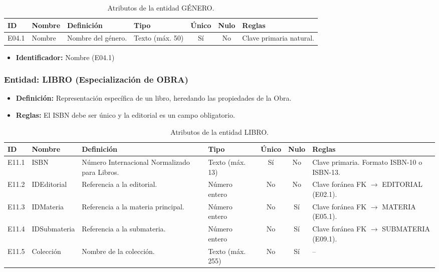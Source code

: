 	\begin{table}[H]
		\centering
		\caption{Atributos de la entidad GÉNERO.}
		\label{tab:dict_genero}
		\small
		\begin{tabularx}{\textwidth}{l l X l c c X}
			\toprule
			\textbf{ID} & \textbf{Nombre} & \textbf{Definición} & \textbf{Tipo} & \textbf{Único} & \textbf{Nulo} & \textbf{Reglas} \\
			\midrule
			E04.1 & Nombre & Nombre del género. & Texto (máx. 50) & Sí & No & Clave primaria natural. \\
			\bottomrule
		\end{tabularx}
	\end{table}
	
	\begin{itemize}
		\item\textbf{Identificador:} Nombre (E04.1)
	\end{itemize}
	
	\subsubsection{Entidad: LIBRO (Especialización de OBRA)}
	\begin{itemize}
		\item\textbf{Definición:} Representación específica de un libro, heredando las propiedades de la Obra.
		\item\textbf{Reglas:} El ISBN debe ser único y la editorial es un campo obligatorio.
	\end{itemize}
	
	\begin{table}[H]
		\centering
		\caption{Atributos de la entidad LIBRO.}
		\label{tab:dict_libro}
		\small
		\begin{tabularx}{\textwidth}{l l X l c c X}
			\toprule
			\textbf{ID} & \textbf{Nombre} & \textbf{Definición} & \textbf{Tipo} & \textbf{Único} & \textbf{Nulo} & \textbf{Reglas} \\
			\midrule
			E11.1 & ISBN & Número Internacional Normalizado para Libros. & Texto (máx. 13) & Sí & No & Clave primaria. Formato ISBN-10 o ISBN-13. \\
			\addlinespace
			E11.2 & IDEditorial & Referencia a la editorial. & Número entero & No & No & Clave foránea FK $\rightarrow$ EDITORIAL (E02.1). \\
			\addlinespace
			E11.3 & IDMateria & Referencia a la materia principal. & Número entero & No & Sí & Clave foránea FK $\rightarrow$ MATERIA (E05.1). \\
			\addlinespace
			E11.4 & IDSubmateria & Referencia a la submateria. & Número entero & No & Sí & Clave foránea FK $\rightarrow$ SUBMATERIA (E09.1). \\
			\addlinespace
			E11.5 & Colección & Nombre de la colección. & Texto (máx. 255) & No & Sí & -- \\
			\bottomrule
		\end{tabularx}
	\end{table}
	
